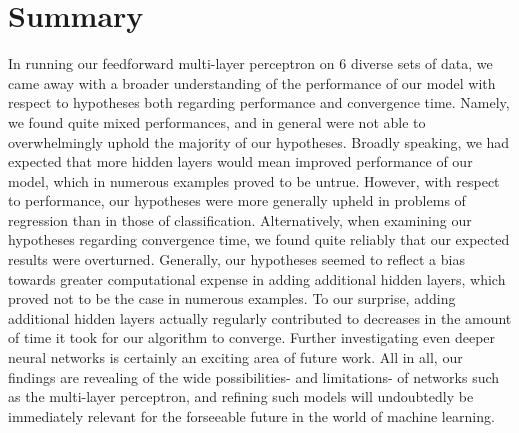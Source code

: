 \documentclass[twoside,11pt]{article}
\begin{document}
\section{Summary}
In running our feedforward multi-layer perceptron on 6 diverse sets of data, we came away with a broader understanding of the performance of our model with respect to
hypotheses both regarding performance and convergence time. Namely, we found quite mixed performances, and in general were not able to overwhelmingly uphold the 
majority of our hypotheses. Broadly speaking, we had expected that more hidden layers would mean improved performance of our model, which in numerous examples
proved to be untrue. However, with respect to performance, our hypotheses were more generally upheld in problems of regression than in those of classification.
Alternatively, when examining our hypotheses regarding convergence time, we found quite reliably that our expected results were overturned. Generally, our hypotheses
seemed to reflect a bias towards greater computational expense in adding additional hidden layers, which proved not to be the case in
numerous examples. To our surprise, adding additional hidden layers actually regularly contributed to decreases in the amount of time it took for our
algorithm to converge. Further investigating even deeper neural networks is certainly an exciting area of future work. All in all, our findings are revealing
of the wide possibilities- and limitations- of networks such as the multi-layer perceptron, and refining such models will undoubtedly be immediately 
relevant for the forseeable future in the world of machine learning.
\end{document}
